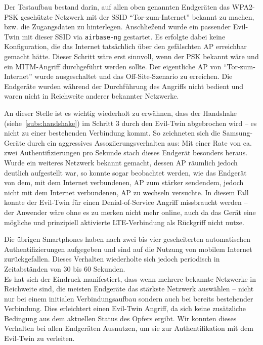 Der Testaufbau bestand darin, auf allen oben genannten Endgeräten das WPA2-PSK geschützte Netzwerk mit der SSID \enquote{Tor-zum-Internet} bekannt zu machen, bzw. die Zugangsdaten zu hinterlegen.
Anschließend wurde ein passender Evil-Twin mit dieser SSID via \texttt{airbase-ng} gestartet. Es erfolgte dabei keine Konfiguration, die das Internet tatsächlich über den gefälschten AP erreichbar gemacht hätte. Dieser Schritt wäre erst sinnvoll, wenn der PSK bekannt wäre und ein MITM-Angriff durchgeführt werden sollte. Der eigentliche AP von \enquote{Tor-zum-Internet} wurde ausgeschaltet und das Off-Site-Szenario zu erreichen.
Die Endgeräte wurden während der Durchführung des Angriffs nicht bedient und waren nicht in Reichweite anderer bekannter Netzwerke.

An dieser Stelle ist es wichtig wiederholt zu erwähnen, dass der Handshake (siehe~\ref{subs:handshake}) im Schritt 3 durch den Evil-Twin abgebrochen wird -- es nicht zu einer bestehenden Verbindung kommt.
So zeichneten sich die Samsung-Geräte durch ein aggressives Assoziierungsverhalten aus: Mit einer Rate von ca. zwei Authentifizierungen pro Sekunde stach dieses Endgerät besonders heraus.
Wurde ein weiteres Netzwerk bekannt gemacht, dessen AP räumlich jedoch deutlich aufgestellt war, so konnte sogar beobachtet werden, wie das Endgerät von dem, mit dem Internet verbundenen, AP zum stärker sendendem, jedoch nicht mit dem Internet verbundenen, AP zu wechseln versuchte. 
In diesem Fall konnte der Evil-Twin für einen Denial-of-Service Angriff missbraucht werden -- der Anwender wäre ohne es zu merken nicht mehr online, auch da das Gerät eine mögliche und prinzipiell aktivierte LTE-Verbindung als Rückgriff nicht nutze.

Die übrigen Smartphones haben nach zwei bis vier gescheiterten automatischen Authentifizierungen aufgegeben und sind auf die Nutzung von mobilem Internet zurückgefallen.
Dieses Verhalten wiederholte sich jedoch periodisch in Zeitabständen von 30 bis 60 Sekunden.\\

Es hat sich der Eindruck manifestiert, dass wenn mehrere bekannte Netzwerke in Reichweite sind, die meisten Endgeräte das stärkste Netzwerk auswählen -- nicht nur bei einem initialen Verbindungsaufbau sondern auch bei bereits bestehender Verbindung. Dies erleichtert einen Evil-Twin Angriff, da sich keine zusätzliche Bedingung aus dem aktuellen Status des Opfers ergibt.
Wir konnten dieses Verhalten bei allen Endgeräten Ausnutzen, um sie zur Authentifikation mit dem Evil-Twin zu verleiten.

